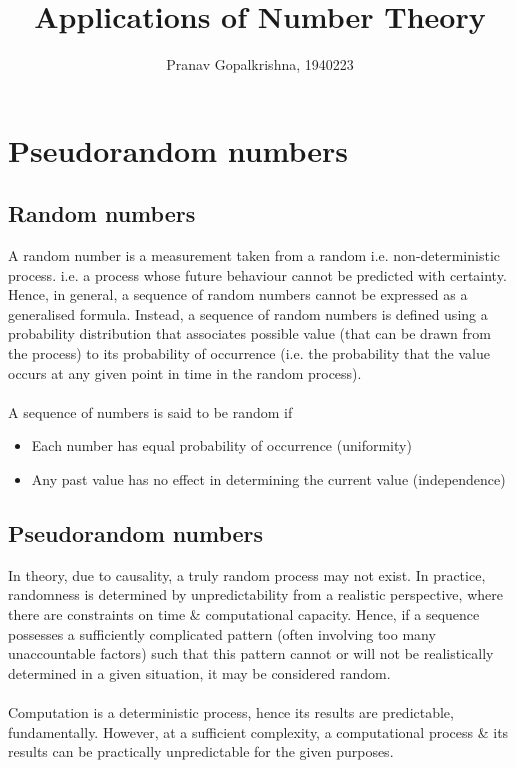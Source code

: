 

\pagestyle{fancy}
\fancyhf{}

\title{Applications of Number Theory}
\author{Pranav Gopalkrishna, 1940223}


\maketitle

\chapter{Pseudorandom numbers}
\section{Random numbers}
A random number is a measurement taken from a random i.e. non-deterministic process. i.e. a process whose future behaviour cannot be predicted with certainty. Hence, in general, a sequence of random numbers cannot be expressed as a generalised formula. Instead, a sequence of random numbers is defined using a probability distribution that associates possible value (that can be drawn from the process) to its probability of occurrence (i.e. the probability that the value occurs at any given point in time in the random process).
\\~\\
A sequence of numbers is said to be random if
\begin{itemize}
	\item Each number has equal probability of occurrence (uniformity)
	\item Any past value has no effect in determining the current value (independence)
\end{itemize}

\section{Pseudorandom numbers}
In theory, due to causality, a truly random process may not exist. In practice, randomness is determined by unpredictability from a realistic perspective, where there are constraints on time \& computational capacity. Hence, if a sequence possesses a sufficiently complicated pattern (often involving too many unaccountable factors) such that this pattern cannot or will not be realistically determined in a given situation, it may be considered random.
\\~\\
Computation is a deterministic process, hence its results are predictable, fundamentally. However, at a sufficient complexity, a computational process \& its results can be practically unpredictable for the given purposes.

